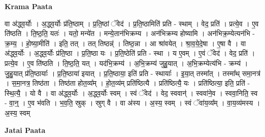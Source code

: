 \documentclass[17pt]{extarticle}
\begin{document}
\textbf{Krama Paata} \newline

वा अ॑द्ध्व॒र्योः । अ॒द्ध्व॒र्योः प्र॑ति॒ष्ठाम् । प्र॒ति॒ष्ठां ॅवेद॑ । प्र॒ति॒ष्ठामिति॑ प्रति - स्थाम् । वेद॒ प्रति॑ । प्रत्ये॒व । ए॒व ति॑ष्ठति । ति॒ष्ठ॒ति॒ यतः॑ । यतो॒ मन्ये॑त । मन्ये॒तान॑भिक्रम्य । अन॑भिक्रम्य होष्यामि । अन॑भिक्र॒म्येत्यन॑भि - क्र॒म्य॒ । हो॒ष्या॒मीति॑ । इति॒ तत् ।
 तत् तिष्ठन्न्॑ । तिष्ठ॒न्ना । आ श्रा॑वयेत् । श्रा॒व॒ये॒दे॒षा । ए॒षा वै । वा अ॑द्ध्व॒र्योः । अ॒द्ध्व॒र्योः प्र॑ति॒ष्ठा । प्र॒ति॒ष्ठा यः । प्र॒ति॒ष्ठेति॑ प्रति - स्था । य ए॒वम् । ए॒वं ॅवेद॑ । वेद॒ प्रति॑ । प्रत्ये॒व । ए॒व ति॑ष्ठति । ति॒ष्ठ॒ति॒ यत् । यद॑भि॒क्रम्य॑ । अ॒भि॒क्रम्य॑ जुहु॒यात् । अ॒भि॒क्रम्येत्य॑भि - क्रम्य॑ । जु॒हु॒यात् प्र॑ति॒ष्ठायाः᳚ । प्र॒ति॒ष्ठाया॑ इयात् । प्र॒ति॒ष्ठाया॒ इति॑ प्रति - स्थायाः᳚ । इ॒या॒त् तस्मा᳚त् । तस्मा᳚थ् समा॒नत्र॑ । स॒मा॒नत्र॒ तिष्ठ॑ता । तिष्ठ॑ता होत॒व्य᳚म् । हो॒त॒व्य॑म् प्रति॑ष्ठित्यै । प्रति॑ष्ठित्यै॒ यः । प्रति॑ष्ठित्या॒ इति॒ प्रति॑ - स्थि॒त्यै॒ । यो वै । वा अ॑द्ध्व॒र्योः । अ॒द्ध्व॒र्योः स्वम् । स्वं ॅवेद॑ । वेद॒ स्ववान्॑ । स्ववा॑ने॒व । स्ववा॒निति॒ स्व - वा॒न्॒ । ए॒व भ॑वति । भ॒व॒ति॒ स्रुक् । स्रुग् वै । वा अ॑स्य । अ॒स्य॒ स्वम् । स्वं ॅवा॑य॒व्य᳚म् । वा॒य॒व्य॑मस्य । अ॒स्य॒ स्वम् \newline

\textbf{Jatai Paata} \newline
\end{document}
